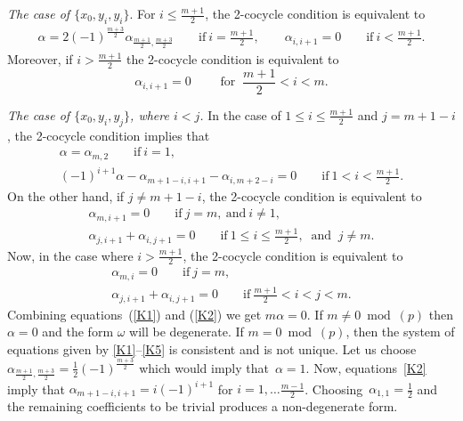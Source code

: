 \documentclass[pdftex]{sigma}
\numberwithin{equation}{section}
\begin{document}
\textit{The case of $\{x_0, y_i, y_i\}$}. For $i \leq \frac{m+1}{2}$, the 2-cocycle condition is equivalent to
\begin{gather}
\alpha = 2(-1)^{\frac{m+3}{2}} \alpha_{\frac{m+1}{2}, \frac{m+3}{2}}\qquad \text{if} \ i=\frac{m+1}{2},\qquad
\alpha_{i,i+1} = 0\qquad \text{if}\ i < \frac{m+1}{2}.\label{K1}
\end{gather}
Moreover, if $i> \frac{m+1}{2}$ the 2-cocycle condition is equivalent to
\[%
\alpha_{i,i+1}=0 \qquad \text{ for } \ \frac{m+1}{2} < i <m.
\]

\textit{The case of $\{x_0, y_i, y_j\}$, where $i<j$.} In the case of $1\leq i \leq \frac{m+1}{2}$ and $j=m+1-i$, the 2-cocycle condition implies that
\begin{gather}
\alpha = \alpha_{m,2} \qquad \text{if}\ i=1,\nonumber \\
(-1)^{i+1}\alpha - \alpha_{m+1-i,i+1}-\alpha_{i,m+2-i} = 0 \qquad \text{if}\ 1<i<\frac{m+1}{2}.\label{K2}
\end{gather}
On the other hand, if $j \neq m+1-i$, the 2-cocycle condition is equivalent to
\begin{gather*}%
\alpha_{m,i+1} = 0\qquad \text{if}\ j=m, \ \text{and}\ i\not = 1,\\
\alpha_{j,i+1}+ \alpha_{i,j+1} = 0 \qquad \text{if} \ 1\leq i \leq \frac{m+1}{2}, \ \text{ and }\ j\not = m.
\end{gather*}
Now, in the case where $i> \frac{m+1}{2}$, the 2-cocycle condition is equivalent to
\begin{gather}
\alpha_{m,i} = 0 \qquad \text{if} \ j=m,\nonumber \\
\alpha_{j,i+1} + \alpha_{i,j+1} = 0 \qquad \text{if} \ \frac{m+1}{2} < i<j<m.\label{K5}
\end{gather}
Combining equations~(\ref{K1}) and (\ref{K2}) we get $m \alpha=0$. If $m \not =0 \bmod(p)$ then $\alpha=0$ and the form $\omega$ will be degenerate. If $m =0 \bmod(p)$, then the system of equations given by \eqref{K1}--\eqref{K5} is consistent and is not unique. Let us choose $\alpha_{\frac{m+1}{2}, \frac{m+3}{2}}=\frac{1}{2} (-1)^{\frac{m+3}{2}}$ which would imply that~$\alpha=1$. Now, equations~\eqref{K2} imply that $\alpha_{m+1-i, i+1}=i (-1)^{i+1}$ for $i=1,\ldots \frac{m-1}{2}$. Choosing~$\alpha_{1,1}=\frac{1}{2}$ and the remaining coefficients to be trivial produces a non-degenerate form.
\end{document}
